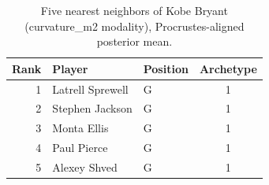 \begin{table}[htbp]
  \centering\small
  \begin{tabular}{rllc}
    \toprule
    Rank & Player & Position & Archetype \\
    \midrule
    1 & Latrell Sprewell & G & 1 \\
    2 & Stephen Jackson & G & 1 \\
    3 & Monta Ellis & G & 1 \\
    4 & Paul Pierce & G & 1 \\
    5 & Alexey Shved & G & 1 \\
    \bottomrule
  \end{tabular}
  \caption{Five nearest neighbors of Kobe Bryant (curvature_m2 modality), Procrustes-aligned posterior mean.}
  \label{tab:Kobe_Bryant_neighbors_curvature_m2}
\end{table}

